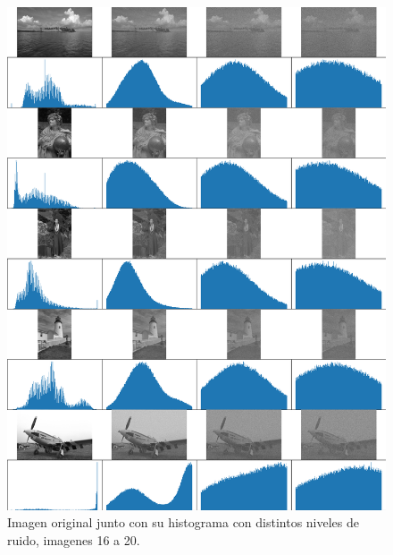 \begin{figure}
    \centering
    \includegraphics[width=\textwidth]{figuras/img_hist_noise_4.png}
    \caption{Imagen original junto con su histograma con distintos niveles de ruido, imagenes 16 a 20.}
\end{figure}


